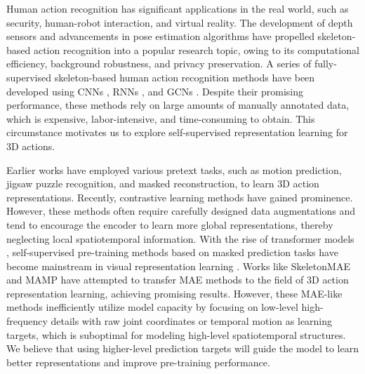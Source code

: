 Human action recognition has significant applications in the real world, such as
security, human-robot interaction, and virtual reality. The development of depth
sensors and advancements in pose estimation algorithms \cite{2018OpenPose, fang2017rmpe, xu2020deep}
have propelled skeleton-based action recognition into a popular research topic,
owing to its computational efficiency, background robustness, and privacy preservation.
A series of fully-supervised skeleton-based human action recognition methods have
been developed using CNNs \cite{du2015skeleton,li2017skeleton}, RNNs \cite{liu2016spatio,zhang2017view},
and GCNs \cite{yan2018spatial,chen2021channel}. Despite their promising performance,
these methods rely on large amounts of manually annotated data, which is expensive,
labor-intensive, and time-consuming to obtain. This circumstance motivates us
to explore self-supervised representation learning for 3D actions.

Earlier works \cite{lin2020ms2l, nie2020unsupervised, su2020predict, zheng2018unsupervised}
have employed various pretext tasks, such as motion prediction, jigsaw puzzle recognition,
and masked reconstruction, to learn 3D action representations. Recently, contrastive
learning methods \cite{rao2021augmented, guo2022contrastive, moliner2022bootstrapped, lin2023actionlet}
have gained prominence. However, these methods often require carefully designed
data augmentations and tend to encourage the encoder to learn more global
representations, thereby neglecting local spatiotemporal information.
With the rise of transformer models \cite{vaswani2017attention}, self-supervised
pre-training methods based on masked prediction tasks have become mainstream in
visual representation learning \cite{rao2021augmented, guo2022contrastive, moliner2022bootstrapped, lin2023actionlet}.
Works like SkeletonMAE \cite{yan2023skeletonmae, wu2023skeletonmae} and MAMP \cite{mao2023masked} have
attempted to transfer MAE \cite{he2022masked} methods to the field of 3D action representation
learning, achieving promising results. However, these MAE-like methods inefficiently
utilize model capacity by focusing on low-level high-frequency details with
raw joint coordinates or temporal motion as learning targets, which is suboptimal
for modeling high-level spatiotemporal structures. We believe that using
higher-level prediction targets will guide the model to learn better representations
and improve pre-training performance.

